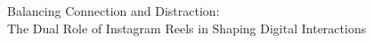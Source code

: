 \documentclass[12pt]{article}
\begin{document}
\thispagestyle{fancy}

\doublespacing

\begin{center}
    Balancing Connection and Distraction: \\
    The Dual Role of Instagram Reels in Shaping Digital Interactions
\end{center}
\end{document}
